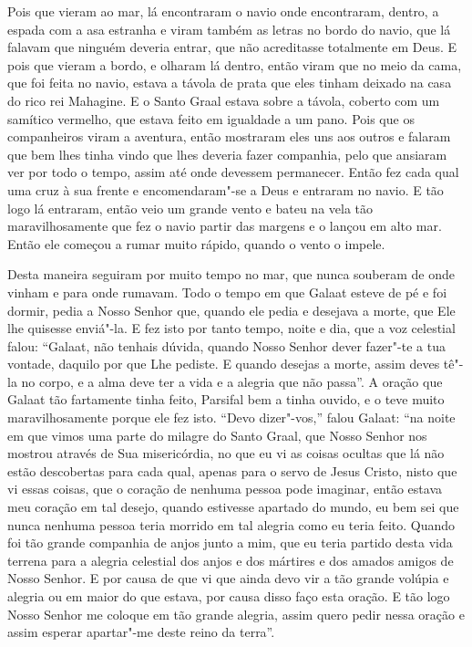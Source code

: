 Pois que vieram ao mar, lá encontraram o navio onde encontraram, dentro, a
espada com a asa estranha e viram também as letras no bordo do navio, que lá
falavam que ninguém deveria entrar, que não acreditasse totalmente em Deus. E
pois que vieram a bordo, e olharam lá dentro, então viram que no meio da cama,
que foi feita no navio, estava a távola de prata que eles tinham deixado na
casa do rico rei Mahagine. E o Santo Graal estava sobre a távola, coberto com
um samítico vermelho, que estava feito em igualdade a um pano. Pois que os
companheiros viram a aventura, então mostraram eles uns aos outros e falaram que
bem lhes tinha vindo que lhes deveria fazer companhia, pelo que ansiaram ver
por todo o tempo, assim até onde devessem permanecer. Então fez cada
qual uma cruz à sua frente e encomendaram"-se a Deus e entraram no navio. E tão
logo lá entraram, então veio um grande vento e bateu na vela tão
maravilhosamente que fez o navio partir das margens e o lançou em alto mar.
Então ele começou a rumar muito rápido, quando o vento o impele. 

Desta maneira seguiram por muito tempo no mar, que nunca souberam de onde vinham
e para onde rumavam. Todo o tempo em que Galaat esteve de pé e foi dormir,
pedia a Nosso Senhor que, quando ele pedia e desejava a morte, que Ele lhe
quisesse enviá"-la. E fez isto por tanto tempo, noite e dia, que a voz celestial
falou: “Galaat, não tenhais dúvida, quando Nosso Senhor dever fazer"-te a tua
vontade, daquilo por que Lhe pediste. E quando desejas a morte, assim deves
tê"-la no corpo, e a alma deve ter a vida e a alegria que não passa”. A
oração que Galaat tão fartamente tinha feito, Parsifal bem a tinha ouvido, e o
teve muito maravilhosamente porque ele fez isto. “Devo dizer"-vos,” falou
Galaat: “na noite em que vimos uma parte do milagre do Santo Graal, que Nosso
Senhor nos mostrou através de Sua misericórdia, no que eu vi as coisas ocultas
que lá não estão descobertas para cada qual, apenas para o servo de Jesus
Cristo, nisto que vi essas coisas, que o coração de nenhuma pessoa pode
imaginar, então estava meu coração em tal desejo, quando estivesse apartado do
mundo, eu bem sei que nunca nenhuma pessoa teria morrido em tal alegria como eu
teria feito. Quando foi tão grande companhia de anjos junto a mim, que eu teria
partido desta vida terrena para a alegria celestial dos anjos e dos mártires e
dos amados amigos de Nosso Senhor. E por causa de que vi que ainda devo vir a
tão grande volúpia e alegria ou em maior do que estava, por causa disso faço
esta oração. E tão logo Nosso Senhor me coloque em tão grande alegria, assim
quero pedir nessa oração e assim esperar apartar"-me deste reino da terra”. 

